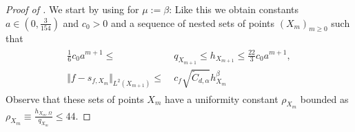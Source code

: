 \documentclass[a4paper, 10pt]{article}
\begin{document}
\begin{proof}[Proof of ]
We start by using  for $\mu := \beta$:
Like this we obtain constants $a \in (0, \frac{3}{154})$ and $c_0 > 0$ and a sequence of nested sets of points $(X_m)_{m \geq 0}$ such that
\begin{align}
\begin{aligned}
\label{eq:proof:properties_sequence}
\frac{1}{6} c_0 a^{m+1} \leq& ~ q_{X_{m+1}} \leq h_{X_{m+1}} \leq \frac{22}{3} c_0 a^{m+1}, \\
%
\Vert f - s_{f, X_m} \Vert_{L^2(X_{m+1})} \leq& ~ c_f \sqrt{\tilde{C}_{d,\alpha}} h_{X_m}^{\beta}
\end{aligned}
\end{align}
Observe that these sets of points $X_m$ have a uniformity constant $\rho_{X_m}$ bounded as $\rho_{X_m} \equiv \frac{h_{X_m, \Omega}}{q_{X_m}} \leq 44$.


\end{proof}
\end{document}
